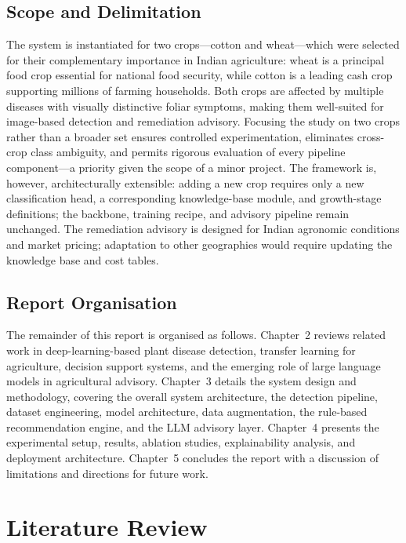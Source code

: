 \documentclass[12pt,a4paper]{report}
\begin{document}
\section{Scope and Delimitation}
The system is instantiated for two crops---cotton and wheat---which were selected for their complementary importance in Indian agriculture: wheat is a principal food crop essential for national food security, while cotton is a leading cash crop supporting millions of farming households. Both crops are affected by multiple diseases with visually distinctive foliar symptoms, making them well-suited for image-based detection and remediation advisory. Focusing the study on two crops rather than a broader set ensures controlled experimentation, eliminates cross-crop class ambiguity, and permits rigorous evaluation of every pipeline component---a priority given the scope of a minor project. The framework is, however, architecturally extensible: adding a new crop requires only a new classification head, a corresponding knowledge-base module, and growth-stage definitions; the backbone, training recipe, and advisory pipeline remain unchanged. The remediation advisory is designed for Indian agronomic conditions and market pricing; adaptation to other geographies would require updating the knowledge base and cost tables.

\section{Report Organisation}
The remainder of this report is organised as follows. Chapter~2 reviews related work in deep-learning-based plant disease detection, transfer learning for agriculture, decision support systems, and the emerging role of large language models in agricultural advisory. Chapter~3 details the system design and methodology, covering the overall system architecture, the detection pipeline, dataset engineering, model architecture, data augmentation, the rule-based recommendation engine, and the LLM advisory layer. Chapter~4 presents the experimental setup, results, ablation studies, explainability analysis, and deployment architecture. Chapter~5 concludes the report with a discussion of limitations and directions for future work.

\chapter{Literature Review}
\end{document}
